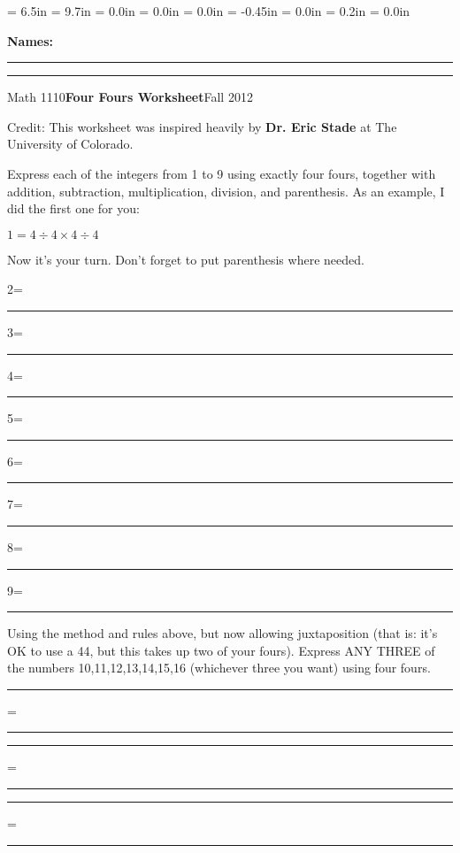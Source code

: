 \documentclass{article}
\begin{document}
\textwidth = 6.5in
\textheight = 9.7in
\oddsidemargin = 0.0in
\evensidemargin = 0.0in
\topmargin = 0.0in
\headheight = -0.45in
\headsep = 0.0in
\parskip = 0.2in
\parindent = 0.0in

\pagestyle{empty}

\textbf{Names:} \rule{6.1in}{0.01in}

\vspace{0.3in}

\noindent\rule{6.7in}{0.01in}

\centerline{Math 1110\hfill{\bf Four Fours Worksheet}\hfill Fall 2012}

\vspace{0.2in}

\noindent Credit: This worksheet was inspired heavily by \textbf{Dr. Eric Stade} at The University of Colorado.

\vspace{0.2in}

\noindent Express each of the integers from 1 to 9 using exactly four fours, together with addition, subtraction, multiplication, division, and parenthesis. As an example, I did the first one for you:

$1=4\div4\times4\div4$

\vspace{0.1in}

\noindent Now it's your turn. Don't forget to put parenthesis where needed. 

2=\rule{2in}{0.01in}

3=\rule{2in}{0.01in}

4=\rule{2in}{0.01in}

5=\rule{2in}{0.01in}

6=\rule{2in}{0.01in}

7=\rule{2in}{0.01in}

8=\rule{2in}{0.01in}

9=\rule{2in}{0.01in}

\newpage

\noindent Using the method and rules above, but now allowing juxtaposition (that is: it's OK to use a 44, but this takes up two of your fours). Express ANY THREE of the numbers 10,11,12,13,14,15,16 (whichever three you want) using four fours.

\rule{1in}{0.01in}=\rule{2in}{0.01in}

\rule{1in}{0.01in}=\rule{2in}{0.01in}

\rule{1in}{0.01in}=\rule{2in}{0.01in}
\end{document}
